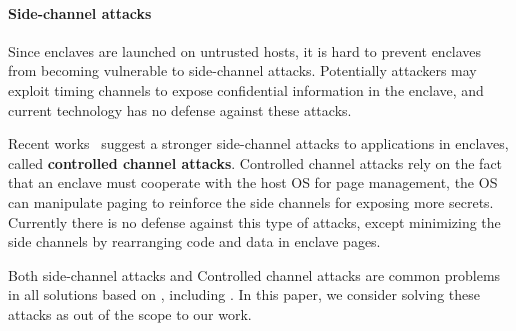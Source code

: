 \paragraph{Side-channel attacks}
Since enclaves are launched on untrusted hosts, it is hard to prevent
enclaves from becoming vulnerable to side-channel attacks.
Potentially attackers may exploit timing channels to expose confidential
information in the enclave, and current \sgx{} technology has no defense
against these attacks.

Recent works~\cite{xu15controlledchannel} suggest a stronger
side-channel attacks to applications in enclaves,
called {\bf controlled channel attacks}.
Controlled channel attacks rely on the fact that an enclave must cooperate
with the host OS for page management,
the OS can manipulate paging to reinforce the side channels
for exposing more secrets.
Currently there is no defense against this type of attacks, except minimizing
the side channels by rearranging code and data in enclave pages.

Both side-channel attacks and Controlled channel attacks
are common problems in all solutions based on \sgx{},
including \haven{}. In this paper, we consider solving these attacks as
out of the scope to our work.


